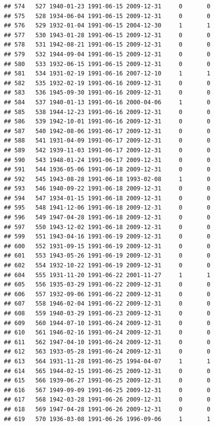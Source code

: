 \documentclass[
]{book}
\begin{document}
\begin{verbatim}
## 574   527 1940-01-23 1991-06-15 2009-12-31     0       0
## 575   528 1934-06-04 1991-06-15 2009-12-31     0       0
## 576   529 1932-01-04 1991-06-15 2004-12-30     1       1
## 577   530 1943-01-28 1991-06-15 2009-12-31     0       0
## 578   531 1942-08-21 1991-06-15 2009-12-31     0       0
## 579   532 1944-09-04 1991-06-15 2009-12-31     0       0
## 580   533 1932-06-15 1991-06-15 2009-12-31     0       0
## 581   534 1931-02-19 1991-06-16 2007-12-10     1       1
## 582   535 1932-02-19 1991-06-16 2009-12-31     0       0
## 583   536 1945-09-30 1991-06-16 2009-12-31     0       0
## 584   537 1940-01-13 1991-06-16 2000-04-06     1       0
## 585   538 1944-12-23 1991-06-16 2009-12-31     0       0
## 586   539 1942-10-01 1991-06-16 2009-12-31     0       0
## 587   540 1942-08-06 1991-06-17 2009-12-31     0       0
## 588   541 1931-04-09 1991-06-17 2009-12-31     0       0
## 589   542 1939-11-03 1991-06-17 2009-12-31     0       0
## 590   543 1948-01-24 1991-06-17 2009-12-31     0       0
## 591   544 1936-05-06 1991-06-18 2009-12-31     0       0
## 592   545 1943-08-28 1991-06-18 1993-02-08     1       0
## 593   546 1940-09-22 1991-06-18 2009-12-31     0       0
## 594   547 1934-01-15 1991-06-18 2009-12-31     0       0
## 595   548 1941-12-06 1991-06-18 2009-12-31     0       0
## 596   549 1947-04-28 1991-06-18 2009-12-31     0       0
## 597   550 1943-12-02 1991-06-18 2009-12-31     0       0
## 599   551 1943-04-16 1991-06-19 2009-12-31     0       0
## 600   552 1931-09-15 1991-06-19 2009-12-31     0       0
## 601   553 1943-05-26 1991-06-19 2009-12-31     0       0
## 602   554 1932-10-22 1991-06-19 2009-12-31     0       0
## 604   555 1931-11-20 1991-06-22 2001-11-27     1       1
## 605   556 1935-03-29 1991-06-22 2009-12-31     0       0
## 606   557 1932-09-06 1991-06-22 2009-12-31     0       0
## 607   558 1946-02-04 1991-06-22 2009-12-31     0       0
## 608   559 1940-03-29 1991-06-23 2009-12-31     0       0
## 609   560 1944-07-10 1991-06-24 2009-12-31     0       0
## 610   561 1946-02-16 1991-06-24 2009-12-31     0       0
## 611   562 1947-04-10 1991-06-24 2009-12-31     0       0
## 612   563 1933-05-28 1991-06-24 2009-12-31     0       0
## 613   564 1931-11-28 1991-06-25 1994-04-07     1       1
## 614   565 1944-02-15 1991-06-25 2009-12-31     0       0
## 615   566 1939-06-27 1991-06-25 2009-12-31     0       0
## 616   567 1949-09-09 1991-06-25 2009-12-31     0       0
## 617   568 1942-03-28 1991-06-26 2009-12-31     0       0
## 618   569 1947-04-28 1991-06-26 2009-12-31     0       0
## 619   570 1936-03-08 1991-06-26 1996-09-06     1       1

\end{verbatim}
\end{document}

